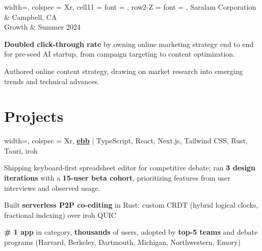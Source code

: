 \documentclass[10pt]{article}
\begin{document}
\vspace{0.5em}

\begin{tblr}{
    width=\textwidth,
    colspec = {Xr},
    cell{1}{1} = {font = {\bfseries}},
    row{2-Z} = {font = {\itshape}},
  }
  Saralam Corporation & Campbell, CA \\
  Growth & Summer 2024  \\
\end{tblr}
\begin{compactitem}
\item \textbf{Doubled click-through rate} by owning online marketing
    strategy end to end for pre-seed AI startup, from campaign
    targeting to content optimization.

\item Authored online content strategy, drawing on market
    research into emerging trends and technical advances.
\end{compactitem}

\vspace{0.5em}

\section{Projects}
\vspace{-0.5em}
\titlerule

\vspace{0.5em}

\begin{tblr}{
    width=\textwidth,
    colspec = {Xr},
  }
  \href{https://ebb.smodi.net}{{\bfseries \ul{ebb}}} | TypeScript, React, Next.js, Tailwind CSS, Rust, Tauri, iroh
\end{tblr}
\vspace{-0.5em}
\begin{compactitem}
\item Shipping keyboard-first spreadsheet editor for competitive debate;
    ran \textbf{3 design iterations} with a \textbf{15-user beta
    cohort}, prioritizing features from user interviews and observed usage.

\item Built \textbf{serverless P2P co-editing} in Rust: custom CRDT (hybrid
    logical clocks, fractional indexing) over iroh QUIC

\item \textbf{\# 1 app} in category, \textbf{thousands} of users,
    adopted by \textbf{top-5
    teams} and debate programs (Harvard, Berkeley, Dartmouth,
    Michigan, Northwestern, Emory)
\end{compactitem}
\end{document}
